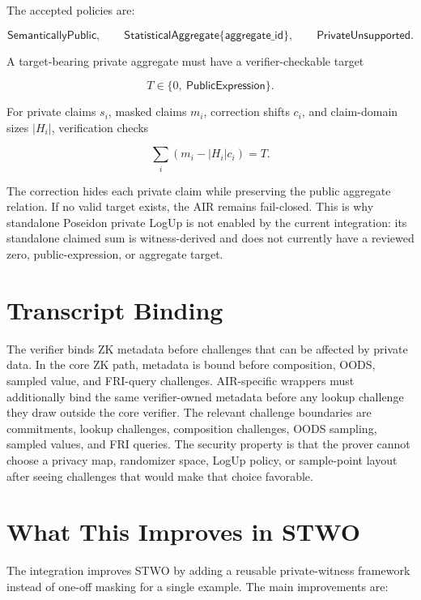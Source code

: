 \documentclass[11pt]{article}
\begin{document}
The accepted policies are:

\[
    \mathsf{SemanticallyPublic},\qquad
    \mathsf{StatisticalAggregate}\{\mathsf{aggregate\_id}\},\qquad
    \mathsf{PrivateUnsupported}.
\]

A target-bearing private aggregate must have a verifier-checkable target

\[
    T \in \{0,\ \mathsf{PublicExpression}\}.
\]

For private claims \(s_i\), masked claims \(m_i\), correction shifts \(c_i\), and
claim-domain sizes \(|H_i|\), verification checks

\[
    \sum_i \left(m_i - |H_i| c_i\right) = T.
\]

The correction hides each private claim while preserving the public aggregate
relation. If no valid target exists, the AIR remains fail-closed. This is why
standalone Poseidon private LogUp is not enabled by the current integration: its
standalone claimed sum is witness-derived and does not currently have a reviewed
zero, public-expression, or aggregate target.

\section{Transcript Binding}

The verifier binds ZK metadata before challenges that can be affected by private
data. In the core ZK path, metadata is bound before composition, OODS, sampled
value, and FRI-query challenges. AIR-specific wrappers must additionally bind the
same verifier-owned metadata before any lookup challenge they draw outside the
core verifier. The relevant challenge boundaries are commitments, lookup
challenges, composition challenges, OODS sampling, sampled values, and FRI
queries. The security property is that the prover cannot choose a privacy map,
randomizer space, LogUp policy, or sample-point layout after seeing challenges
that would make that choice favorable.

\section{What This Improves in STWO}

The integration improves STWO by adding a reusable private-witness framework
instead of one-off masking for a single example. The main improvements are:
\end{document}
